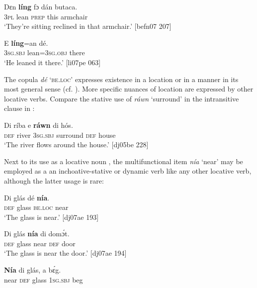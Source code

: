 \ea%
    \label{ex:key:935}
    \gll Dɛn  \textbf{líng}    fɔ  dán  butaca.\\
\textsc{3pl}  lean    \textsc{prep}  this  armchair\\

\glt ‘They’re sitting reclined in that armchair.’ [befn07 207]\\
\z

\ea%
    \label{ex:key:936}
    \gll E    \textbf{líng}=an    dé.\\
\textsc{3sg.sbj}  lean=\textsc{3sg.obj}  there\\

\glt ‘He leaned it there.’ [li07pe 063]
\z

The copula \textit{dé} \textsc{‘be.loc’} expresses existence in a location or in a manner in its most general sense (cf. ). More specific nuances of location are expressed by other locative verbs. Compare the stative use of \textit{ráwn} ‘surround’ in the intransitive clause in :


\ea%
    \label{ex:key:937}
    \gll Di  ríba    e    \textbf{ráwn}    di  hós.\\
\textsc{def}  river  \textsc{3sg.sbj}  surround  \textsc{def}  house\\

\glt ‘The river flows around the house.’ [dj05be 228]
\z

Next to its use as a locative noun , the multifunctional item \textit{nía} ‘near’ may be employed as a an inchoative-stative  or dynamic verb  like any other locative verb, although the latter usage is rare: 


\ea%
    \label{ex:key:938}
    \gll Di  glás    dé    \textbf{nía}.\\
\textsc{def}  glass  \textsc{be.loc}  near\\
\glt ‘The glass is near.’ [dj07ae 193]\\
\z

\ea%
    \label{ex:key:939}
    \gll Di  glás    \textbf{nía}    di  domɔ́t.\\
\textsc{def}  glass  near    \textsc{def}  door\\

\glt ‘The glass is near the door.’ [dj07ae 194]
\z


\ea%
    \label{ex:key:940}
    \gll \textbf{Nía}    di  glás,    a    bɛ́g.\\
near    \textsc{def}  glass  \textsc{1sg.sbj}  beg\\

